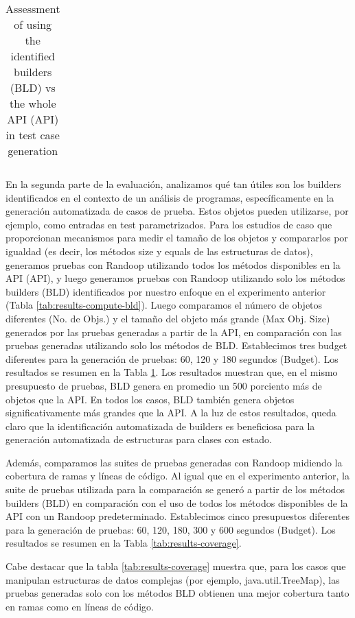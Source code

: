 \begin{table}[t!]
\begin{tabular}{ c l c c}
\end{tabular}%

\caption{Assessment of using the identified builders (BLD) vs the whole API (API) in test case generation}
\label{tab:results-obj}
\end{table}

En la segunda parte de la evaluación, analizamos qué tan útiles son los builders identificados en el contexto de un análisis de programas, específicamente en la generación automatizada de casos de prueba. Estos objetos pueden utilizarse, por ejemplo, como entradas en test parametrizados. Para los estudios de caso que proporcionan mecanismos para medir el tamaño de los objetos y compararlos por igualdad (es decir, los métodos size y equals de las estructuras de datos), generamos pruebas con Randoop utilizando todos los métodos disponibles en la API (API), y luego generamos pruebas con Randoop utilizando solo los métodos builders (BLD) identificados por nuestro enfoque en el experimento anterior (Tabla \ref{tab:results-compute-bld}). Luego comparamos el número de objetos diferentes (No. de Objs.) y el tamaño del objeto más grande (Max Obj. Size) generados por las pruebas generadas a partir de la API, en comparación con las pruebas generadas utilizando solo los métodos de BLD. Establecimos tres budget diferentes para la generación de pruebas: 60, 120 y 180 segundos (Budget). Los resultados se resumen en la Tabla \ref{tab:results-obj}. Los resultados muestran que, en el mismo presupuesto de pruebas, BLD genera en promedio un 500 porciento más de objetos que la API. En todos los casos, BLD también genera objetos significativamente más grandes que la API. A la luz de estos resultados, queda claro que la identificación automatizada de builders es beneficiosa para la generación automatizada de estructuras para clases con estado.

Además, comparamos las suites de pruebas generadas con Randoop midiendo la cobertura de ramas y líneas de código. Al igual que en el experimento anterior, la suite de pruebas utilizada para la comparación se generó a partir de los métodos builders (BLD) en comparación con el uso de todos los métodos disponibles de la API con un Randoop predeterminado. Establecimos cinco presupuestos diferentes para la generación de pruebas: 60, 120, 180, 300 y 600 segundos (Budget). Los resultados se resumen en la Tabla \ref{tab:results-coverage}.

Cabe destacar que la tabla \ref{tab:results-coverage} muestra que, para los casos que manipulan estructuras de datos complejas (por ejemplo, java.util.TreeMap), las pruebas generadas solo con los métodos BLD obtienen una mejor cobertura tanto en ramas como en líneas de código.

